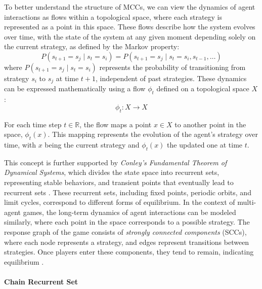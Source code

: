         \noindent
        To better understand the structure of MCCs, we can view the dynamics of agent interactions as flows within a topological space, where each strategy is represented as a point in this space. These flows describe how the system evolves over time, with the state of the system at any given moment depending solely on the current strategy, as defined by the Markov property:
        \begin{equation}
            P(s_{t+1} = s_j \mid s_t = s_i) = P(s_{t+1} = s_j \mid s_t = s_i, s_{t-1}, \dots)
            \label{eq:markov_property}
        \end{equation}
        where $P(s_{t+1} = s_j \mid s_t = s_i)$ represents the probability of transitioning from strategy $s_i$ to $s_j$ at time $t+1$, independent of past strategies. These dynamics can be expressed mathematically using a flow $\phi_t$ defined on a topological space $X$:
        \begin{equation}
            \phi_t: X \rightarrow X
            \label{eq:flow_phi}
        \end{equation}

        \noindent
        For each time step $t \in \mathbb{R}$, the flow maps a point $x \in X$ to another point in the space, $\phi_t(x)$. This mapping represents the evolution of the agent’s strategy over time, with $x$ being the current strategy and $\phi_t(x)$ the updated one at time $t$.\tinydouble
        
        \noindent
        This concept is further supported by \emph{Conley's Fundamental Theorem of Dynamical Systems}, which divides the state space into recurrent sets, representing stable behaviors, and transient points that eventually lead to recurrent sets \cite{conley1978isolated}\cite{Norton1995}. These recurrent sets, including fixed points, periodic orbits, and limit cycles, correspond to different forms of equilibrium. In the context of multi-agent games, the long-term dynamics of agent interactions can be modeled similarly, where each point in the space corresponds to a possible strategy. The response graph of the game consists of \emph{strongly connected components} (SCCs), where each node represents a strategy, and edges represent transitions between strategies. Once players enter these components, they tend to remain, indicating equilibrium \cite{omidshafiei2019alpharank}.
        
        \paragraph{Chain Recurrent Set}

